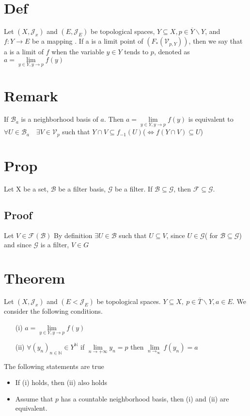 \documentclass{book}
\begin{document}
\section{Def}
Let $(X,\mathcal{J}_x)$ and $(E,\mathcal{J}_E)$ be topological spaces, $Y\subseteq X, p\in \overline{Y}\backslash Y$, and $f: Y\rightarrow E$ be a mapping . If a is a limit point of $(F_*(\mathcal{V}_{p,Y}))$, then we say that a is a limit of $f$ when the variable $y\in Y$ tends to $p$, denoted as $a=\lim\limits_{y\in Y,y\rightarrow p}f(y)$
\section{Remark}
If $\mathscr{B}_a$ is a neighborhood basis of $a$. Then $a=\lim\limits_{y\in Y,y\rightarrow p}f(y) $ is equivalent to $\forall U\in \mathscr{B}_a\quad \exists V\in \mathcal{V}_p$ such that $Y\cap V\subseteq f_{-1}(U)$($\Leftrightarrow f(Y\cap V)\subseteq U$)
\section{Prop}
Let X be a set, $\mathscr{B}$ be a filter basis, $\mathscr{G}$ be a filter. If $\mathscr{B}\subseteq\mathscr{G}$, then $\mathcal{F}\subseteq \mathscr{G}$.
\subsection*{Proof}Let $V\in \mathcal{F}(\mathscr{B})$ By definition $\exists U\in \mathscr{B}$ such that $U\subseteq V$, since $U\in \mathscr{G}$( for $\mathscr{B}\subseteq \mathscr{G}$) and since $\mathscr{G}$ is a filter, $V\in G$
\section{Theorem}
Let $(X,\mathcal{J}_x)$ and $(E<\mathcal{J}_E)$ be topological spaces. $Y\subseteq X, \ p\in \overline{T}\backslash Y, a\in E$. We consider the following conditions.
\begin{itemize}
    \item[(i)] $a=\lim\limits_{y\in Y,y\rightarrow p}f(y)$
    \item [(ii)]$\forall (y_n)_{n\in \mathbb{N} }\in Y^\mathbb{N} $ if $\lim\limits_{n\rightarrow +\infty}y_n=p$ then $\lim\limits_{n\rightarrow_\infty}f(y_n)=a$ 
\end{itemize}The following statements are true\begin{itemize}
    \item If (i) holds, then (ii) also holds
    \item Assume that $p$ has a countable neighborhood basis, then (i) and (ii) are equivalent.
\end{itemize}
\end{document}
